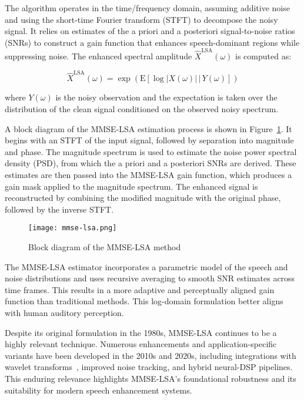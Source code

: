The algorithm operates in the time/frequency domain, assuming additive noise and using the short-time Fourier transform (STFT) to decompose the noisy signal. It relies on estimates of the a priori and a posteriori signal-to-noise ratios (SNRs) to construct a gain function that enhances speech-dominant regions while suppressing noise. The enhanced spectral amplitude \( \hat{X}^{\text{LSA}}(\omega) \) is computed as:

\begin{equation}
    \hat{X}^{\text{LSA}}(\omega) = \exp \left( \mathrm{E} \left[ \log |X(\omega)| \,\big|\, Y(\omega) \right] \right)
\end{equation}

where \( Y(\omega) \) is the noisy observation and the expectation is taken over the distribution of the clean signal conditioned on the observed noisy spectrum.

A block diagram of the MMSE-LSA estimation process is shown in Figure~\ref{fig:mmse_lsa_block}. It begins with an STFT of the input signal, followed by separation into magnitude and phase. The magnitude spectrum is used to estimate the noise power spectral density (PSD), from which the a priori and a posteriori SNRs are derived. These estimates are then passed into the MMSE-LSA gain function, which produces a gain mask applied to the magnitude spectrum. The enhanced signal is reconstructed by combining the modified magnitude with the original phase, followed by the inverse STFT.

\begin{figure}[H]
    \centering
    \texttt{[image: mmse-lsa.png]}
    \caption{\label{fig:mmse_lsa_block} Block diagram of the MMSE-LSA method}
\end{figure}

The MMSE-LSA estimator incorporates a parametric model of the speech and noise distributions and uses recursive averaging to smooth SNR estimates across time frames. This results in a more adaptive and perceptually aligned gain function than traditional methods. This log-domain formulation better aligns with human auditory perception.

Despite its original formulation in the 1980s, MMSE-LSA continues to be a highly relevant technique. Numerous enhancements and application-specific variants have been developed in the 2010s and 2020s, including integrations with wavelet transforms~\cite{wei2016mmse}, improved noise tracking, and hybrid neural-DSP pipelines. This enduring relevance highlights MMSE-LSA's foundational robustness and its suitability for modern speech enhancement systems.

